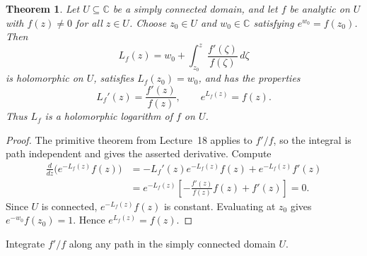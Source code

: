 \documentclass[11pt]{article}
\theoremstyle{plain}
\newtheorem{theorem}{Theorem}[section]
\theoremstyle{definition}
\theoremstyle{remark}
\numberwithin{equation}{section}
\newcommand{\C}{\mathbb{C}}
\newenvironment{lecturefigure}
 {\par\addvspace{0.25em}\begingroup\setlength{\parskip}{0pt}\centering}
 {\par\endgroup\addvspace{0.25em}}
\begin{document}
\begin{theorem}\label{thm:log-f}
Let $U\subseteq\C$ be a simply connected domain, and let $f$ be analytic on $U$
with $f(z)\ne0$ for all $z\in U$. Choose $z_0\in U$ and $w_0\in\C$
satisfying $e^{w_0}=f(z_0)$. Then
\[
 \boxed{\displaystyle L_f(z)=w_0+
 \int_{z_0}^z\frac{f'(\zeta)}{f(\zeta)}\,d\zeta}
\]
is holomorphic on $U$, satisfies $L_f(z_0)=w_0$, and has the properties
\[
 L_f'(z)=\frac{f'(z)}{f(z)},\qquad e^{L_f(z)}=f(z).
\]
Thus $L_f$ is a holomorphic logarithm of $f$ on $U$.
\end{theorem}
\begin{proof}
The primitive theorem from Lecture~18 applies to $f'/f$, so the integral is
path independent and gives the asserted derivative. Compute
\begin{align*}
 \frac{d}{dz}\bigl(e^{-L_f(z)}f(z)\bigr)
 &=-L_f'(z)e^{-L_f(z)}f(z)+e^{-L_f(z)}f'(z)\\
 &=e^{-L_f(z)}\left[-\frac{f'(z)}{f(z)}f(z)+f'(z)\right]=0.
\end{align*}
Since $U$ is connected, $e^{-L_f(z)}f(z)$ is constant. Evaluating at
$z_0$ gives $e^{-w_0}f(z_0)=1$. Hence $e^{L_f(z)}=f(z)$.
\end{proof}


\begin{lecturefigure}

{\small Integrate $f'/f$ along any path in the simply connected domain $U$.}
\end{lecturefigure}
\end{document}
